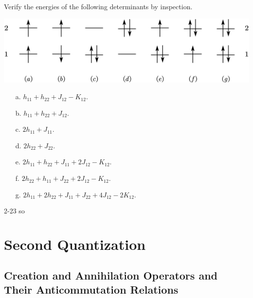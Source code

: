 \documentclass[a4paper]{book}
\begin{document}
	\begin{exercise}
	Verify the energies of the following determinants by inspection.
	
	\begin{center}
	\includegraphics[scale=1.0]{89.png}
	\end{center}
	
	\begin{enumerate}
	
	\item[a.] $h_{11} + h_{22} +  J_{12} - K_{12}$.
	
	\item[b.] $h_{11} + h_{22} +  J_{12}$.
	
	\item[c.] $2h_{11} +  J_{11}$.
	
	\item[d.] $2h_{22} +  J_{22}$.
	
	\item[e.] $2h_{11} + h_{22} +  J_{11} + 2J_{12} - K_{12}$.
	
	\item[f.] $2h_{22} + h_{11} +  J_{22} + 2J_{12} - K_{12}$.
	
	\item[g.] $2h_{11} + 2h_{22} +  J_{11} +  J_{22} + 4J_{12} - 2K_{12}$.
	
	
	\end{enumerate}		
	
	\end{exercise}
	
	\begin{solution}
		2-23 so
	\end{solution}
	
	\section{Second Quantization}
	
	\subsection{Creation and Annihilation Operators and Their Anticommutation Relations}
	
\end{document}
